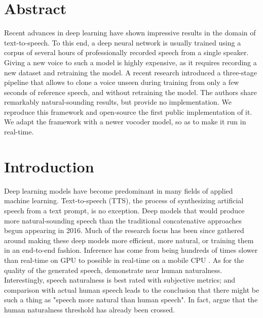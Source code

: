 \documentclass[a4paper, oneside, 12pt, english]{article}
\begin{document}
\section*{Abstract}
Recent advances in deep learning have shown impressive results in the domain of text-to-speech. To this end, a deep neural network is usually trained using a corpus of several hours of professionally recorded speech from a single speaker. Giving a new voice to such a model is highly expensive, as it requires recording a new dataset and retraining the model. A recent research introduced a three-stage pipeline that allows to clone a voice unseen during training from only a few seconds of reference speech, and without retraining the model. The authors share remarkably natural-sounding results, but provide no implementation. We reproduce this framework and open-source the first public implementation of it. We adapt the framework with a newer vocoder model, so as to make it run in real-time.
\clearpage

\tableofcontents
\clearpage

\section{Introduction}
Deep learning models have become predominant in many fields of applied machine learning. Text-to-speech (TTS), the process of synthesizing artificial speech from a text prompt, is no exception. Deep models that would produce more natural-sounding speech than the traditional concatenative approaches begun appearing in 2016. Much of the research focus has been since gathered around making these deep models more efficient, more natural, or training them in an end-to-end fashion. Inference has come from being hundreds of times slower than real-time on GPU \citep{WaveNet} to possible in real-time on a mobile CPU \citep{EfficientNeuralAudioSynthesis}. As for the quality of the generated speech, \citet{Tacotron2} demonstrate near human naturalness. Interestingly, speech naturalness is best rated with subjective metrics; and comparison with actual human speech leads to the conclusion that there might be such a thing as "speech more natural than human speech". In fact, \citet{MOSNaturalness} argue that the human naturalness threshold has already been crossed.
\end{document}
